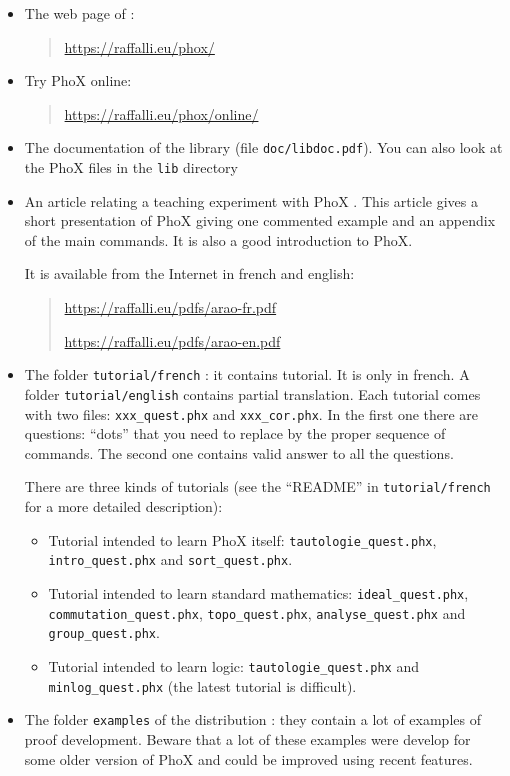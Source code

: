 \begin{itemize}
\item The web page of \AFD:

\begin{quote}
  \url{https://raffalli.eu/phox/}
\end{quote}

\item Try PhoX online:

\begin{quote}
  \url{https://raffalli.eu/phox/online/}
\end{quote}

\item The documentation of the library (file \verb#doc/libdoc.pdf#).
 You can also look at the PhoX files in the \verb#lib# directory

\item An article relating a teaching experiment with PhoX
\cite{RD01}. This article gives a short presentation of PhoX giving
one commented example and an appendix of the main commands. It is also
 a good introduction to PhoX.

It is available from the Internet in french and english:
\begin{quote}
  \url{https://raffalli.eu/pdfs/arao-fr.pdf}

  \url{https://raffalli.eu/pdfs/arao-en.pdf}
\end{quote}

\item The folder \verb#tutorial/french# : it contains tutorial.
It is only in french. A folder \verb#tutorial/english# contains partial
translation.
Each tutorial comes with two files:
\verb#xxx_quest.phx# and \verb#xxx_cor.phx#. In the first one there are
questions:
``dots'' that you need to replace by the proper sequence of
commands. The second one contains valid answer to all the questions.

There are three kinds of tutorials (see the ``README'' in
\verb#tutorial/french# for a more detailed description):
\begin{itemize}
\item Tutorial intended to learn PhoX itself:
\verb#tautologie_quest.phx#,
\verb#intro_quest.phx# and
\verb#sort_quest.phx#.
\item Tutorial intended to learn standard mathematics:
\verb#ideal_quest.phx#,
\verb#commutation_quest.phx#, \verb#topo_quest.phx#,
\verb#analyse_quest.phx# and \verb#group_quest.phx#.
\item Tutorial intended to learn logic:
\verb#tautologie_quest.phx# and \verb#minlog_quest.phx# (the latest
tutorial is difficult).
\end{itemize}

\item The folder \verb#examples# of the distribution : they contain a lot of
examples of proof development. Beware that a lot of these examples
were develop for some older version of PhoX and could be improved
using recent features.


\end{itemize}







